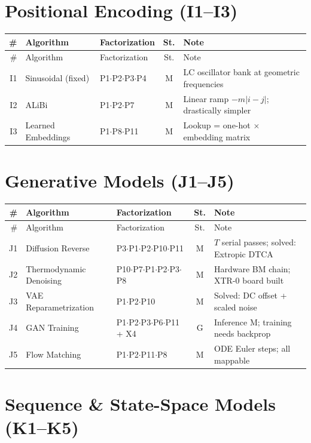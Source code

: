 \documentclass[10pt]{article}
\begin{document}
\section{Positional Encoding (I1--I3)}

\begin{longtable}{rlp{3.0cm}cp{4.8cm}}
\toprule
\# & Algorithm & Factorization & St. & Note \\
\midrule
\endfirsthead
\toprule
\# & Algorithm & Factorization & St. & Note \\
\midrule
\endhead
\bottomrule
\endfoot
I1 & Sinusoidal (fixed) & P1$\cdot$P2$\cdot$P3$\cdot$P4 & M & LC oscillator bank at geometric frequencies \\
I2 & ALiBi & P1$\cdot$P2$\cdot$P7 & M & Linear ramp $-m|i-j|$; drastically simpler \\
I3 & Learned Embeddings & P1$\cdot$P8$\cdot$P11 & M & Lookup = one-hot $\times$ embedding matrix \\
\end{longtable}

\section{Generative Models (J1--J5)}

\begin{longtable}{rlp{3.0cm}cp{4.8cm}}
\toprule
\# & Algorithm & Factorization & St. & Note \\
\midrule
\endfirsthead
\toprule
\# & Algorithm & Factorization & St. & Note \\
\midrule
\endhead
\bottomrule
\endfoot
J1 & Diffusion Reverse & P3$\cdot$P1$\cdot$P2$\cdot$P10$\cdot$P11 & M & $T$ serial passes; solved: Extropic DTCA \\
J2 & Thermodynamic Denoising & P10$\cdot$P7$\cdot$P1$\cdot$P2$\cdot$P3$\cdot$P8 & M & Hardware BM chain; XTR-0 board built \\
J3 & VAE Reparametrization & P1$\cdot$P2$\cdot$P10 & M & Solved: DC offset + scaled noise \\
J4 & GAN Training & P1$\cdot$P2$\cdot$P3$\cdot$P6$\cdot$P11 + X4 & G & Inference M; training needs backprop \\
J5 & Flow Matching & P1$\cdot$P2$\cdot$P11$\cdot$P8 & M & ODE Euler steps; all mappable \\
\end{longtable}

\section{Sequence \& State-Space Models (K1--K5)}
\end{document}
